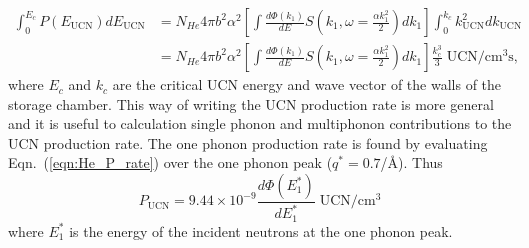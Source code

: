 \begin{equation}
\label{eqn:He_P_rate}
\begin{split}
\int _0 ^{E_c} P(E_{\text{UCN}})dE_{\text{UCN}} &= N_{He} 4 \pi b^2
\alpha^2 \left[ \int \frac{d\Phi(k_1)}{dE} S \left( k_1,
  \omega=\frac{\alpha k_1^2}{2} \right)dk_1 \right] \int_0^{k_c}
k_{\text{UCN}}^2dk_{\text{UCN}} \\ &=N_{He} 4 \pi b^2 \alpha^2 \left[
  \int \frac{d\Phi(k_1)}{dE} S \left( k_1, \omega=\frac{\alpha
    k_1^2}{2} \right) dk_1 \right] \frac{k_c^3}{3}\;
\text{UCN}/\text{cm}^3 \text{s},
\end{split}
\end{equation}
where $E_c$ and $k_c$ are the critical UCN energy and wave vector of
the walls of the storage chamber. This way of writing the UCN
production rate is more general and it is useful to calculation single
phonon and multiphonon contributions to the UCN production rate.  The
one phonon production rate is found by evaluating
Eqn.~(\ref{eqn:He_P_rate}) over the one phonon peak ($q^*=0.7$/\AA).
Thus
\begin{equation}
P_{\text{UCN}}=9.44 \times 10^{-9}\frac{d\Phi (E_1^*)}{dE_1^*} \;
\text{UCN}/\text{cm}^3
\end{equation}
 where $E_1^*$ is the energy of the incident neutrons at the one phonon peak.






